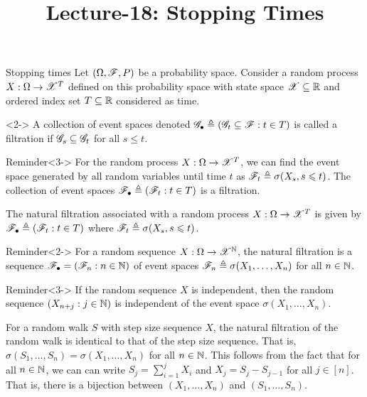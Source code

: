 \documentclass[12pt,aspectratio=169]{beamer}
\title{Lecture-18: Stopping Times}
\date{}
\begin{document}
\pagestyle{empty}
\maketitle



\begin{frame}{Stopping times}
Let $(\Omega, \mathscr{F}, P)$ be a probability space. %
Consider a random process $X:\Omega\to\mathscr{X}^T$ defined on this probability space with state space $\mathscr{X} \subseteq \mathbb{R}$ and ordered index set $T\subseteq \mathbb{R}$ considered as time. 
\begin{Definition}<2->
A collection of event spaces denoted $\mathscr{G}_{\bullet} \triangleq (\mathscr{G}_t \subseteq \mathscr{F}: t \in T)$ is called a filtration if $\mathscr{G}_s \subseteq \mathscr{G}_t$ for all $s \le t$. 
\end{Definition}
\begin{block}{Reminder}<3->
For the random process $X:\Omega\to\mathscr{X}^T$, 
we can find the event space generated by all random variables until time $t$ as $\mathscr{F}_t\triangleq \sigma(X_s, s \leqslant t)$.  
The collection of event spaces $\mathscr{F}_\bullet \triangleq (\mathscr{F}_t: t \in T)$ is a filtration.
\end{block}
\end{frame}

\begin{frame}
\begin{Definition}
The natural filtration associated with a random process $X:\Omega \to \mathscr{X}^T$ is given by $\mathscr{F}_\bullet \triangleq (\mathscr{F}_t: t\in T)$ where $\mathscr{F}_t \triangleq \sigma(X_s, s\leqslant t)$.  
\end{Definition}
\begin{block}{Reminder}<2->
For a random sequence $X: \Omega \to \mathscr{X}^{\mathbb{N}}$, the natural filtration is a sequence $\mathscr{F}_\bullet = (\mathscr{F}_n: n \in \mathbb{N})$ of event spaces $\mathscr{F}_n \triangleq \sigma(X_1, \dots, X_n)$ for all $n \in \mathbb{N}$. 
\end{block}
\begin{block}{Reminder}<3->
If the random sequence $X$ is independent, 
then the random sequence $(X_{n+j}: j \in \mathbb{N})$ is independent of the event space $\sigma(X_1, \dots, X_n)$. 
\end{block}
\end{frame}

\begin{frame}
\begin{Example} 
For a random walk $S$ with step size sequence $X$, 
the natural filtration of the random walk is identical to that of the step size sequence. 
That is, $\sigma(S_1, \dots, S_n) = \sigma(X_1, \dots, X_n)$ for all $n \in \mathbb{N}$. 
This follows from the fact that for all $n \in \mathbb{N}$, 
we can can write $S_j = \sum_{i=1}^jX_i$ and $X_j = S_j - S_{j-1}$ for all $j \in [n]$. 
That is, there is a bijection between $(X_1, \dots, X_n)$ and $(S_1, \dots, S_n)$. 
\end{Example}
\end{frame}
\end{document}
